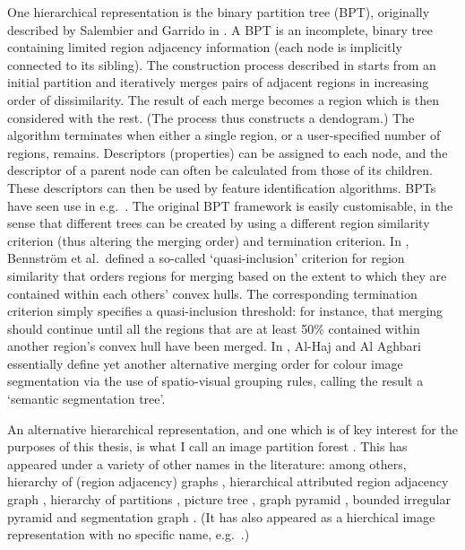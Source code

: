 One hierarchical representation is the binary partition tree (BPT), originally described by Salembier and Garrido in \cite{salembier00}. A BPT is an incomplete, binary tree containing limited region adjacency information (each node is implicitly connected to its sibling). The construction process described in \cite{salembier00} starts from an initial partition and iteratively merges pairs of adjacent regions in increasing order of dissimilarity. The result of each merge becomes a region which is then considered with the rest. (The process thus constructs a dendogram.) The algorithm terminates when either a single region, or a user-specified number of regions, remains. Descriptors (properties) can be assigned to each node, and the descriptor of a parent node can often be calculated from those of its children. These descriptors can then be used by feature identification algorithms. BPTs have seen use in e.g.~\cite{cooray01,salembier02}. The original BPT framework is easily customisable, in the sense that different trees can be created by using a different region similarity criterion (thus altering the merging order) and termination criterion. In \cite{bennstrom04}, Bennstr\"om et al.\ defined a so-called `quasi-inclusion' criterion for region similarity that orders regions for merging based on the extent to which they are contained within each others' convex hulls. The corresponding termination criterion simply specifies a quasi-inclusion threshold: for instance, that merging should continue until all the regions that are at least 50\% contained within another region's convex hull have been merged. In \cite{al-haj08}, Al-Haj and Al Aghbari essentially define yet another alternative merging order for colour image segmentation via the use of spatio-visual grouping rules, calling the result a `semantic segmentation tree'.

An alternative hierarchical representation, and one which is of key interest for the purposes of this thesis, is what I call an image partition forest \cite{gvccimi08,gvcispa09}. This has appeared under a variety of other names in the literature: among others, hierarchy of (region adjacency) graphs \cite{kropatsch04,nacken95,shen97}, hierarchical attributed region adjacency graph \cite{fischer04}, hierarchy of partitions \cite{haxhimusa03,lezoray06}, picture tree \cite{andrade03}, graph pyramid \cite{kerren06}, bounded irregular pyramid \cite{marfil07} and segmentation graph \cite{borenstein06}. (It has also appeared as a hierchical image representation with no specific name, e.g.~\cite{qimin04,yu02}.)

